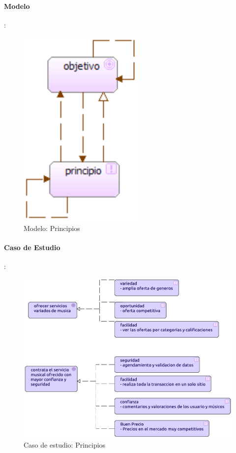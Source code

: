 \paragraph{Modelo}:
\begin{figure}[h!]
	\centering
	\includegraphics[width=0.4\linewidth]{Desarrollo/ArquitecturaEmpresarial/Motivacion/imgs/PrincipiosMetamodelo.PNG}
	\caption{Modelo: Principios}
\end{figure}
\newpage
\paragraph{Caso de Estudio}:
\begin{figure}[h!]
	\centering
	\includegraphics[width=\linewidth]{Desarrollo/ArquitecturaEmpresarial/Motivacion/imgs/Principios.pdf}
	\caption{Caso de estudio: Principios}
	\label{fig:comportamiento}
\end{figure}

